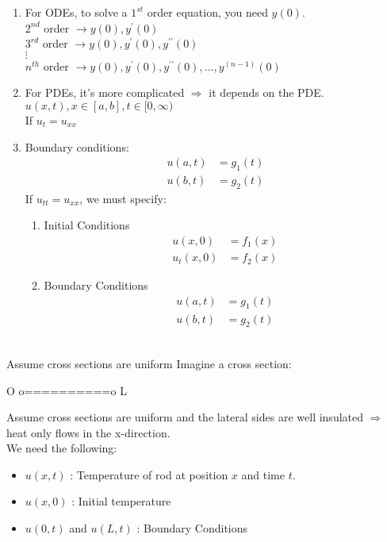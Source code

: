 \begin{enumerate}
  \item For ODEs, to solve a $1^{st}$ order equation, you need $y(0)$.\\
  $2^{nd}$ order $\rightarrow y(0), y^\prime(0)$\\
  $3^{rd}$ order $\rightarrow y(0), y^\prime(0), y^{\prime\prime}(0)$\\
  $\vdots$\\
  $n^{th}$ order $\rightarrow y(0), y^\prime(0), y^{\prime\prime}(0), \ldots, y^{(n - 1)}(0)$
  \item For PDEs, it's more complicated $\Rightarrow$ it depends on the PDE.\\
  \Ex $u(x, t), x \in [a, b], t \in [0, \infty)$\\
  If $u_t = u_{xx}$
  \item Boundary conditions:
  \begin{align}
    u(a, t) & = g_1(t)\\
    u(b, t) & = g_2(t)
  \end{align}
  If $u_{tt} = u_{xx}$, we must specify:
  \begin{enumerate}
    \item Initial Conditions
    \begin{align}
      u(x, 0) & = f_1(x)\\
      u_t(x, 0) & = f_2(x)
    \end{align}
    \item Boundary Conditions
    \begin{align}
      u(a, t) & = g_1(t)\\
      u(b, t) & = g_2(t)
    \end{align}
  \end{enumerate}
\end{enumerate}
\\
Assume cross sections are uniform
Imagine a cross section:
\begin{center}
  O o==========o L
\end{center}
Assume cross sections are uniform and the lateral sides are well insulated $\Rightarrow$ heat only flows in the x-direction.\\
We need the following:
\begin{itemize}
  \item $u(x, t)$ : Temperature of rod at position $x$ and time $t$.
  \item $u(x, 0)$ : Initial temperature
  \item $u(0, t)$ and $u(L, t)$ : Boundary Conditions
\end{itemize}
